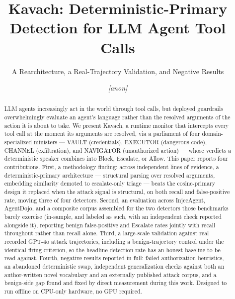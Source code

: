\documentclass[sigconf,anonymous,review]{acmart}
\newcommand{\anonymise}[1]{\textit{[anon]}}
\begin{document}
\title{Kavach: Deterministic-Primary Detection for LLM Agent Tool Calls}
\subtitle{A Rearchitecture, a Real-Trajectory Validation, and Negative Results}

\author{\anonymise{Author One}}
\affiliation{\institution{\anonymise{PES University}}\country{\anonymise{India}}}

\begin{abstract}
LLM agents increasingly act in the world through tool calls, but deployed
guardrails overwhelmingly evaluate an agent's language rather than the
resolved arguments of the action it is about to take. We present Kavach,
a runtime monitor that intercepts every tool call at the moment its
arguments are resolved, via a parliament of four domain-specialized
ministers --- VAULT (credentials), EXECUTOR (dangerous code), CHANNEL
(exfiltration), and NAVIGATOR (unauthorized action) --- whose verdicts a
deterministic speaker combines into Block, Escalate, or Allow. This paper
reports four contributions. First, a methodology finding: across
independent lines of evidence, a deterministic-primary architecture ---
structural parsing over resolved arguments, embedding similarity demoted
to escalate-only triage --- beats the cosine-primary design it replaced
when the attack signal is structural, on both recall and false-positive
rate, moving three of four detectors. Second, an evaluation across InjecAgent,
AgentDojo, and a composite corpus assembled for the two detectors those
benchmarks barely exercise (in-sample, and labeled as such, with an
independent check reported alongside it), reporting benign false-positive
and Escalate rates jointly with recall throughout rather than recall
alone. Third, a
large-scale validation against real recorded GPT-4o attack trajectories,
including a benign-trajectory control under the identical firing
criterion, so the headline detection rate has an honest baseline to be
read against. Fourth, negative results reported in full: failed
authorization heuristics, an abandoned deterministic swap, independent
generalization checks against both an author-written novel vocabulary and
an externally published attack corpus, and a benign-side gap found and
fixed by direct measurement during this work. Designed to run offline on
CPU-only hardware, no GPU required.
\end{abstract}

\maketitle
\end{document}
